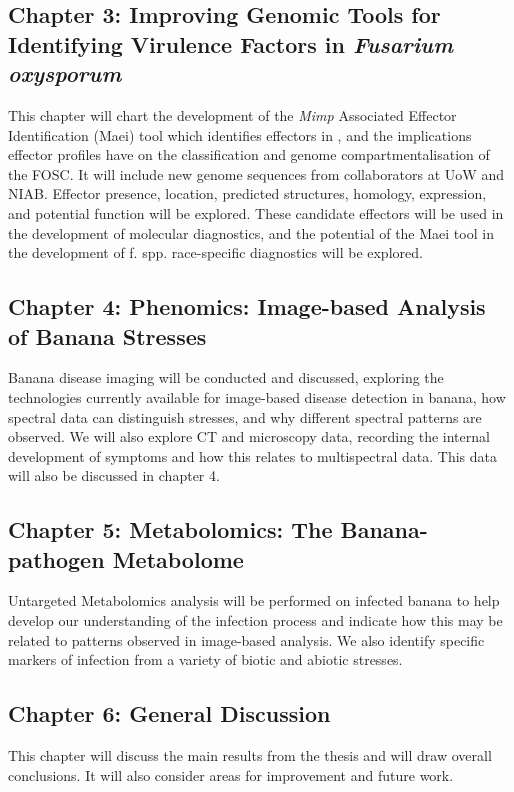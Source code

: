 \subsection{Chapter 3: Improving Genomic Tools for Identifying Virulence Factors in \textit{Fusarium oxysporum}} 

This chapter will chart the development of the \textit{Mimp} Associated Effector Identification (Maei) tool which identifies effectors in \Fo, and the implications effector profiles have on the classification and genome compartmentalisation of the FOSC. It will include new genome sequences from collaborators at UoW and NIAB. Effector presence, location, predicted structures, homology, expression, and potential function will be explored. 
These candidate effectors will be used in the development of molecular diagnostics, and the potential of the Maei tool in the development of \Fo f. spp. race-specific diagnostics will be explored. 

\subsection{Chapter 4: Phenomics: Image-based Analysis of Banana Stresses}

Banana disease imaging will be conducted and discussed, exploring the technologies currently available for image-based disease detection in banana, how spectral data can distinguish stresses, and why different spectral patterns are observed. 
We will also explore CT and microscopy data, recording the internal development of symptoms and how this relates to multispectral data. This data will also be discussed in chapter 4. 

\subsection{Chapter 5: Metabolomics: The Banana-pathogen Metabolome}
Untargeted Metabolomics analysis will be performed on infected banana to help develop our understanding of the \Focub infection process and indicate how this may be related to patterns observed in image-based analysis. We also identify specific markers of infection from a variety of biotic and abiotic stresses. 

\subsection{Chapter 6: General Discussion}
This chapter will discuss the main results from the thesis and will draw overall conclusions. It will also consider areas for improvement and future work. 


 

 



 



 



 